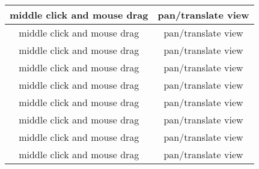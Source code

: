 \begin{appendix}
\begin{table}[!h]
\begin{center}
\begin{tabular}{|c|c|}
				\hline
				middle click and mouse drag                 & pan/translate view                                       \\
				\hline
				middle click and mouse drag                 & pan/translate view                                       \\
				\hline
				middle click and mouse drag                 & pan/translate view                                       \\
				\hline
				middle click and mouse drag                 & pan/translate view                                       \\
				\hline
				middle click and mouse drag                 & pan/translate view                                       \\
				\hline
				middle click and mouse drag                 & pan/translate view                                       \\
				\hline
				middle click and mouse drag                 & pan/translate view                                       \\
				\hline
				middle click and mouse drag                 & pan/translate view                                       \\
				\hline
				middle click and mouse drag                 & pan/translate view                                       \\


				\hline
			\end{tabular}
		\end{center}
	\end{table}
\end{appendix}
